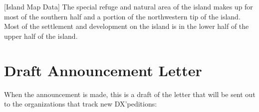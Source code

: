 \documentclass[11pt]{article}
\begin{document}
\noindent%
\begin{minipage}{\linewidth}%
\captionsetup{width=0.8\linewidth}
[Island Map Data]{ The special refuge and natural
area of the island makes up for most of the southern half and a portion
of the northwestern tip of the island.   Most of the settlement
and development on the island is in the lower half of the upper half
of the island.}
\label{geol3}
\end{minipage}
\vskip5mm

\section{Draft Announcement Letter}

When the announcement is made, this is a draft of the 
letter that will be sent out to the organizations
that track new DX'peditions:
\end{document}
